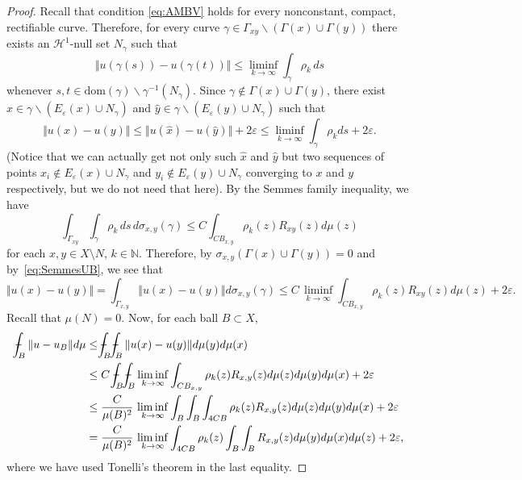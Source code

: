 \documentclass[11pt, letterpaper]{amsart} %
\newcommand*{\N}{{\mathbb N}}
\newcommand*{\eps}{\varepsilon}
\providecommand*{\vint}[1]{\mathchoice
          {\mathop{\vrule width 5pt height 3 pt depth -2.5pt
                  \kern -9pt \kern 1pt\intop}\nolimits_{\kern -5pt{#1}}}
          {\mathop{\vrule width 5pt height 3 pt depth -2.6pt
                  \kern -6pt \intop}\nolimits_{\kern -3pt{#1}}}
          {\mathop{\vrule width 5pt height 3 pt depth -2.6pt
                  \kern -6pt \intop}\nolimits_{\kern -3pt{#1}}}
          {\mathop{\vrule width 5pt height 3 pt depth -2.6pt
                  \kern -6pt \intop}\nolimits_{\kern -3pt{#1}}}}
\numberwithin{equation}{section}
\theoremstyle{plain}
\theoremstyle{definition}
\begin{document}
{\begin{proof}
Recall that condition \eqref{eq:AMBV} holds for every nonconstant, compact, rectifiable curve.  Therefore, for every curve 
$\gamma\in \Gamma_{xy}\backslash (\Gamma (x)\cup \Gamma (y))$ there exists an $\mathcal{H}^1$-null set $N_\gamma$ such that
\[
\Vert u(\gamma (s))-u(\gamma (t))\Vert\leq\liminf_{k\to\infty}\int_{\gamma}\rho_k\, ds
\]
whenever $s,t\in\mathrm{dom}(\gamma )\backslash\gamma^{-1}(N_\gamma )$. Since 
$\gamma\notin \Gamma (x)\cup\Gamma (y)$, there exist 
$\hat{x}\in \gamma\backslash (E_\varepsilon (x)\cup N_\gamma )$ and 
$\hat{y}\in \gamma\backslash (E_\varepsilon (y)\cup N_\gamma )$ such that
\begin{equation}\label{eq:SemmesUB}
\Vert u(x)-u(y)\Vert \leq\Vert u(\hat{x})-u(\hat{y})\Vert+2\eps\leq \liminf_{k\to\infty}\int_\gamma \rho_k ds+2\eps.
\end{equation}
(Notice that we can actually get not only such $\hat{x}$ and $\hat{y}$ but two sequences of points 
$x_i\notin E_\varepsilon (x)\cup N_\gamma$ and $y_i\notin E_\varepsilon (y)\cup N_\gamma$ 
converging to $x$ and $y$ respectively, but we do not need that here).
By the Semmes family inequality, we have
\[
\int_{\Gamma_{xy}}\int_\gamma \rho_k \, ds\, d\sigma_{x,y} (\gamma )\leq C\int_{CB_{x,y}}\rho_k(z) R_{xy}(z)d\mu (z)
\]
for each $x,y\in X\setminus N$, $k\in\N$. Therefore, by $\sigma_{x,y}(\Gamma (x)\cup \Gamma (y))=0$ and 
by~\eqref{eq:SemmesUB}, we see that
\[ 
 \Vert u(x)-u(y)\Vert=\int_{\Gamma_{x,y}}\Vert u(x)-u(y)\Vert d\sigma_{x,y} (\gamma)
\le   
C\, \liminf_{k\to\infty}\int_{CB_{x,y}}\rho_k(z) R_{xy}(z)d\mu (z)+2\eps.
\] 
Recall that $\mu(N)=0$. Now, for each ball $B\subset X$,
\begin{align}\label{eq:Semmes-Max1}
\vint{B}\Vert u-u_B\Vert d\mu&\leq\vint{B}\vint{B}\Vert u(x)-u(y)\Vert d\mu (y)d\mu (x)\notag\\
&\leq C\, \vint{B}\vint{B}\liminf_{k\to\infty}\int_{CB_{x,y}}\rho_k(z) R_{x,y}(z)d\mu (z)d\mu(y)d\mu(x)+2\eps\notag\\
&\leq \frac{C}{\mu(B)^2}\, \liminf_{k\to\infty}\int_{B}\int_{B}\int_{4CB}\rho_k(z) R_{x,y}(z)d\mu (z)d\mu(y)d\mu(x)+2\eps\notag\\
&= \frac{C}{\mu(B)^2}\,\liminf_{k\to\infty}\int_{4CB}\rho_k(z)\int_{B}\int_{B}R_{x,y}(z)d\mu(y)d\mu(x)d\mu (z)+2\eps,
\end{align}
where we have used Tonelli's theorem in the last equality.  


\end{proof}}
\end{document}
